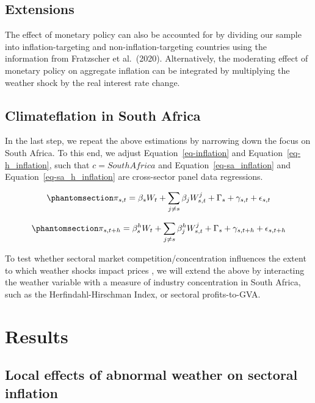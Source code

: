 \documentclass[
  letterpaper,
  DIV=11,
  numbers=noendperiod]{scrartcl}
\begin{document}
\subsection{Extensions}\label{extensions}

The effect of monetary policy can also be accounted for by dividing our
sample into inflation-targeting and non-inflation-targeting countries
using the information from Fratzscher et al.~(2020). Alternatively, the
moderating effect of monetary policy on aggregate inflation can be
integrated by multiplying the weather shock by the real interest rate
change.

\subsection{Climateflation in South
Africa}\label{climateflation-in-south-africa}

In the last step, we repeat the above estimations by narrowing down the
focus on South Africa. To this end, we adjust
Equation~\ref{eq-inflation} and Equation~\ref{eq-h_inflation}, such that
\(c = South Africa\) and Equation~\ref{eq-sa_inflation} and
Equation~\ref{eq-sa_h_inflation} are cross-sector panel data
regressions.

\begin{equation}\phantomsection\label{eq-sa_inflation}{
\pi_{s,t} = \beta_sW_t + \sum_{j\neq s} \beta_j W_{s,t}^j + \Gamma_s + \gamma_{s,t} + \epsilon_{s,t}                    
}\end{equation}

\begin{equation}\phantomsection\label{eq-sa_h_inflation}{
\pi_{s,t+h} = \beta_s^h W_t+ \sum_{j \neq s} \beta_j^h W_{s,t}^j + \Gamma_{s} + \gamma_{s,t+h} + \epsilon_{s,t+h}       
}\end{equation}

To test whether sectoral market competition/concentration influences the
extent to which weather shocks impact prices \citep{weber2023}, we will
extend the above by interacting the weather variable with a measure of
industry concentration in South Africa, such as the Herfindahl-Hirschman
Index, or sectoral profits-to-GVA.

\section{Results}\label{results}

\subsection{Local effects of abnormal weather on sectoral
inflation}\label{local-effects-of-abnormal-weather-on-sectoral-inflation}
\end{document}
